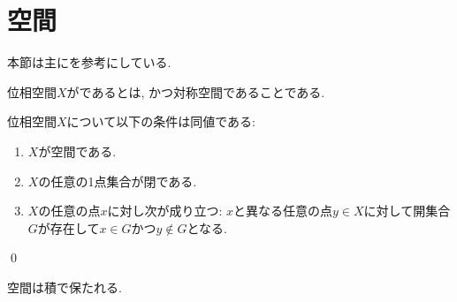 \documentclass[uplatex, dvipdfmx, a4paper, 12pt, class=jsbook, crop=false]{standalone}
\begin{document}
\section{空間}
\label{sec:T1-spaces}

\begin{source}
	本節は主に\cite[Chapter 16]{Schechter1997HAF}を参考にしている.
\end{source}

\begin{definition}
	位相空間$ X $がであるとは, かつ対称空間であることである.
\end{definition}

\begin{proposition}
	\label{T100001}
	位相空間$ X $について以下の条件は同値である:
	\begin{enumerate}
		\item $ X $が空間である.
		\item $ X $の任意の1点集合が閉である.
		\item $ X $の任意の点$ x $に対し次が成り立つ: $ x $と異なる任意の点$ y \in X $に対して開集合$ G $が存在して$ x \in G $かつ$ y \not\in G $となる.
	\end{enumerate}
	\qed
\end{proposition}

\begin{proposition}
	空間は積で保たれる.
\end{proposition}
\end{document}
